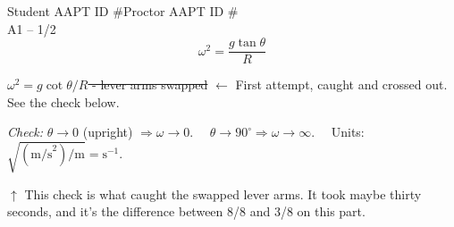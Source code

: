 \documentclass[11pt]{article}
\newcommand{\ann}[1]{{\color{gradered}\sffamily\footnotesize #1}}
\begin{document}
\begin{sheet}{Student AAPT ID \#\qquad Proctor AAPT ID \#\\ A1 -- 1/2}
\[ \omega^2 = \frac{g\tan\theta}{R} \]

\sout{$\omega^2 = g\cot\theta / R$ \quad - lever arms swapped} \quad
\ann{$\leftarrow$ First attempt, caught and crossed out. See the check below.}

\medskip
{}

\medskip
\emph{Check:} $\theta \to 0$ (upright) $\Rightarrow \omega \to 0$. \checkmark\ \
$\theta \to 90^\circ \Rightarrow \omega \to \infty$. \checkmark\ \ Units: $\sqrt{(\text{m/s}^2)/\text{m}}
= \text{s}^{-1}$. \checkmark

\ann{$\uparrow$ This check is what caught the swapped lever arms. It took maybe thirty
seconds, and it's the difference between 8/8 and 3/8 on this part.}

\end{sheet}
\end{document}
